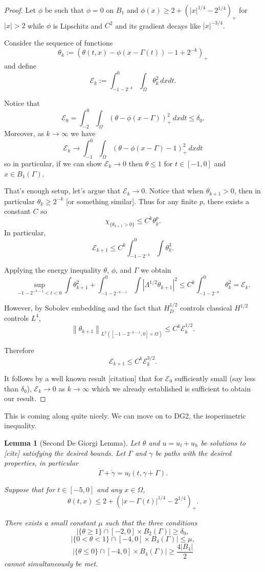 \documentclass[11pt]{amsart}
\newtheorem{lemma}[theorem]{Lemma}
\theoremstyle{remark}
\theoremstyle{definition}
\newcommand{\E}{\mathcal{E}}
\newcommand{\norm}[1]{\left\lVert#1\right\rVert}
\newcommand{\paren}[1]{\left( #1 \right)}
\newcommand{\abs}[1]{\left\lvert #1 \right\rvert}
\newcommand{\indic}[1]{\chi_{\{#1\}}}
\newcommand{\ulow}{u_l}
\newcommand{\uhigh}{u_h}
\begin{document}
\begin{proof}
Let $\phi$ be such that $\phi = 0$ on $B_1$ and $\phi(x) \geq 2 + \paren{|x|^{1/4}-2^{1/4}}_+$ for $|x|>2$ while $\phi$ is Lipschitz and $C^2$ and its gradient decays like $|x|^{-3/4}$.  

Consider the sequence of functions
\[ \theta_k := (\theta(t,x) - \phi(x - \Gamma(t)) - 1 + 2^{-k})_+ \]
and define
\[ \E_k := \int_{-1-2^{-k}}^0 \int_\Omega \theta_k^2 \,dxdt. \]

Notice that
\[ \E_0 = \int_{-2}^0 \int_\Omega (\theta - \phi(x-\Gamma))_+^2 \,dxdt \leq \delta_0. \]
Moreover, as $k \to \infty$ we have
\[ \E_k \to \int_{-1}^0 \int_\Omega (\theta - \phi(x-\Gamma) - 1)_+^2 \,dxdt \]
so in particular, if we can show $\E_k \to 0$ then $\theta \leq 1$ for $t \in [-1,0]$ and $x \in B_1(\Gamma)$.  

That's enough setup, let's argue that $\E_k \to 0$.  Notice that when $\theta_{k+1}>0$, then in particular $\theta_k \geq 2^{-k}$ [or something similar].  Thus for any finite $p$, there exists a constant $C$ so
\[ \indic{\theta_{k+1}>0} \leq C^k \theta_k^p. \]
In particular,
\[ \E_{k+1} \leq C^k \int_{-1-2^{-k}}^0 \int \theta_k^3. \]

Applying the energy inequality $\theta$, $\phi$, and $\Gamma$ we obtain
\[ \sup_{-1-2^{-k-1}<t<0} \int \theta_{k+1}^2 + \int_{-1-2^{-k-1}}^0 \int \abs{\Lambda^{1/2}\theta_{k+1}}^2 \leq C^k \int_{-1-2^{-k}}^0 \theta_k^2 = \E_k. \]

However, by Sobolev embedding and the fact that $H_D^{1/2}$ controls classical $H^{1/2}$ controls $L^4$,
\[ \norm{\theta_{k+1}}_{L^3([-1-2^{-k-1},0]\times\Omega)} \leq C^k \E_k^{1/2}. \]

Therefore
\[ \E_{k+1} \leq C^k \E_k^{3/2}. \]

It follows by a well known result [citation] that for $\E_0$ sufficiently small (say less than $\delta_0$), $\E_k \to 0$ as $k \to \infty$ which we already established is sufficient to obtain our result.  
\end{proof}


This is coming along quite nicely.  We can move on to DG2, the isoperimetric inequality.  

\begin{lemma}[Second De Giorgi Lemma] \label{thm:DG2}
Let $\theta$ and $u = \ulow + \uhigh$ be solutions to [cite] satisfying the desired bounds.  Let $\Gamma$ and $\gamma$ be paths with the desired properties, in particular
\[ \dot{\Gamma} +\dot{\gamma} = \ulow(t,\gamma + \Gamma). \]

Suppose that for $t \in [-5,0]$ and any $x \in \Omega$,
\[ \theta(t,x) \leq 2 + \paren{|x-\Gamma(t)|^{1/4}-2^{1/4}}_+. \]

There exists a small constant $\mu$ such that the three conditions
\[ \abs{\{\theta \geq 1\} \cap [-2,0]\times B_2(\Gamma)} \geq \delta_0, \]
\[ \abs{\{0 < \theta < 1\} \cap [-4,0]\times B_4(\Gamma)} \leq \mu, \]
\[ \abs{\{\theta \leq 0\} \cap [-4,0]\times B_4(\Gamma)} \geq \frac{4 |B_4|}{2} \]
cannot simultaneously be met.  
\end{lemma}
\end{document}
